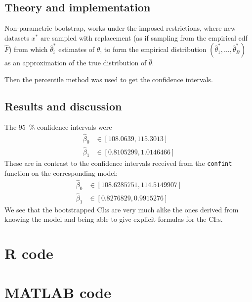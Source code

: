 \documentclass[11pt, a4paper]{article}
\begin{document}
\subsection{Theory and implementation}\label{sec:a3_non_param_bootstrap}
Non-parametric bootstrap, works under the imposed restrictions, where
new datasets $x^*$ are sampled with replacement
(as if sampling from the empirical cdf $\hat F$)
from which $\hat\theta^*_i$ estimates of $\theta$,
to form the empirical distribution $(\hat\theta^*_1, \ldots, \hat\theta^*_B)$
as an approximation of the true distribution of $\hat\theta$.

Then the percentile method was used to get the confidence intervals.
\subsection{Results and discussion}
The \SI{95}{\percent} confidence intervals were
\begin{align*}
	\hat\beta_0 &\in [\num[round-mode = places]{108.0639}, \num[round-mode = places]{115.3013}] \\
	\hat\beta_1 &\in [\num[round-mode = places]{0.8105299}, \num[round-mode = places]{1.0146466}]
\end{align*}
These are in contrast to the confidence intervals received from the \texttt{confint} function
on the corresponding model:
\begin{align*}
	\hat\beta_0 &\in [\num[round-mode = places]{108.6285751}, \num[round-mode = places]{114.5149907}] \\
	\hat\beta_1 &\in [\num[round-mode = places]{0.8276829}, \num[round-mode = places]{0.9915276}]
\end{align*}
We see that the bootstrapped CI:s are very much alike the ones derived from
knowing the model and being able to give explicit formulas for the CI:s.

\clearpage
\appendix %

\section{R code}


\section{MATLAB code}

\end{document}
